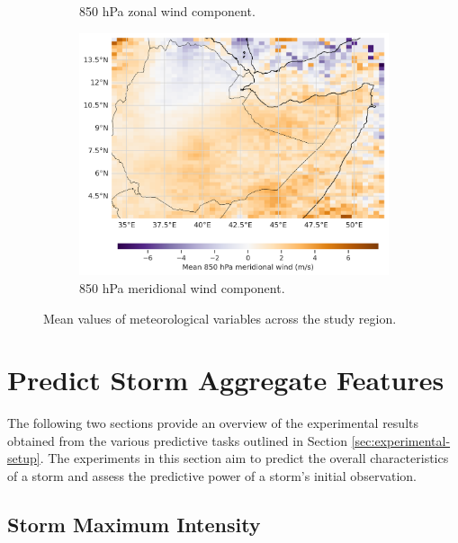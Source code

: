 \begin{figure}[ht]
\begin{subfigure}[t]{0.4\textwidth}
    \caption{850 hPa zonal wind component.}
    \label{fig:u850_mean_by_loc}
\end{subfigure}
\hfill
\begin{subfigure}[t]{0.4\textwidth}
    \includegraphics[width=\textwidth]{../figures/generated/exploration/v850_mean_by_loc.png}
    \caption{850 hPa meridional wind component.}
    \label{fig:v850_mean_by_loc}
\end{subfigure}

\caption{Mean values of meteorological variables across the study region.}
\label{fig:figures}
\end{figure}

\section{Predict Storm Aggregate Features}

The following two sections provide an overview of the experimental results obtained from the various predictive tasks outlined in Section \ref{sec:experimental-setup}. The experiments in this section aim to predict the overall characteristics of a storm and assess the predictive power of a storm's initial observation.

\subsection{Storm Maximum Intensity}

